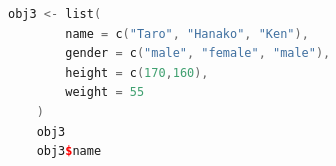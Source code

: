 \begin{lstlisting}[language=c++,label={code:05_06},caption={List type}]
	obj3 <- list(
		name = c("Taro", "Hanako", "Ken"),
		gender = c("male", "female", "male"),
		height = c(170,160),
		weight = 55
	)
	obj3
	obj3$name
\end{lstlisting}
